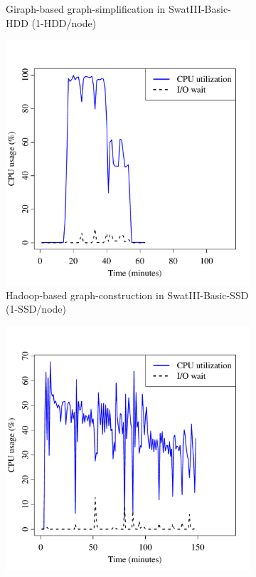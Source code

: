 \documentclass[10pt, conference, compsocconf]{IEEEtran}
\begin{document}
\begin{figure}[htb]
\begin{subfigure}[b]{0.23\textwidth}
                \caption{Giraph-based graph-simplification in SwatIII-Basic-HDD (1-HDD/node)}
                \label{fig:ECCPUHDD}
        \end{subfigure}       
        \begin{subfigure}[b]{0.23\textwidth}
                \includegraphics[width=\textwidth]{Figure/SystemData/Plots/BGCPUSSD.pdf}
                \caption{Hadoop-based graph-construction in SwatIII-Basic-SSD (1-SSD/node)}
                \label{fig:BGCPUSSD}
        \end{subfigure}    
        \begin{subfigure}[b]{0.23\textwidth}
                \includegraphics[width=\textwidth]{Figure/SystemData/Plots/ECCPUSSD.pdf}

\end{subfigure}
\end{figure}
\end{document}
